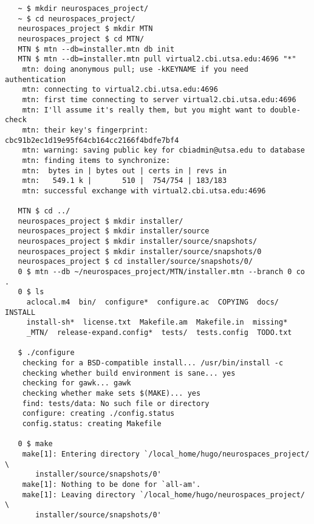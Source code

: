 \documentclass[12pt]{article}
\begin{document}
\begin{verbatim}
   ~ $ mkdir neurospaces_project/
   ~ $ cd neurospaces_project/
   neurospaces_project $ mkdir MTN
   neurospaces_project $ cd MTN/
   MTN $ mtn --db=installer.mtn db init
   MTN $ mtn --db=installer.mtn pull virtual2.cbi.utsa.edu:4696 "*"
    mtn: doing anonymous pull; use -kKEYNAME if you need authentication
    mtn: connecting to virtual2.cbi.utsa.edu:4696
    mtn: first time connecting to server virtual2.cbi.utsa.edu:4696
    mtn: I'll assume it's really them, but you might want to double-check
    mtn: their key's fingerprint: cbc91b2ec1d19e95f64cb164cc2166f4bdfe7bf4
    mtn: warning: saving public key for cbiadmin@utsa.edu to database
    mtn: finding items to synchronize:
    mtn:  bytes in | bytes out | certs in | revs in
    mtn:   549.1 k |       510 |  754/754 | 183/183
    mtn: successful exchange with virtual2.cbi.utsa.edu:4696

   MTN $ cd ../
   neurospaces_project $ mkdir installer/
   neurospaces_project $ mkdir installer/source
   neurospaces_project $ mkdir installer/source/snapshots/
   neurospaces_project $ mkdir installer/source/snapshots/0
   neurospaces_project $ cd installer/source/snapshots/0/
   0 $ mtn --db ~/neurospaces_project/MTN/installer.mtn --branch 0 co .
   0 $ ls
     aclocal.m4  bin/  configure*  configure.ac  COPYING  docs/  INSTALL
     install-sh*  license.txt  Makefile.am  Makefile.in  missing* 
     _MTN/  release-expand.config*  tests/  tests.config  TODO.txt

   $ ./configure 
    checking for a BSD-compatible install... /usr/bin/install -c
    checking whether build environment is sane... yes
    checking for gawk... gawk
    checking whether make sets $(MAKE)... yes
    find: tests/data: No such file or directory
    configure: creating ./config.status
    config.status: creating Makefile

   0 $ make
    make[1]: Entering directory `/local_home/hugo/neurospaces_project/  \
       installer/source/snapshots/0'
    make[1]: Nothing to be done for `all-am'.
    make[1]: Leaving directory `/local_home/hugo/neurospaces_project/  \
       installer/source/snapshots/0'


\end{verbatim}
\end{document}
